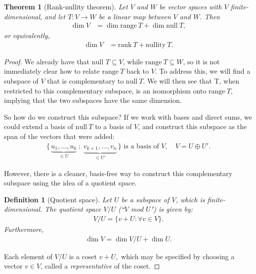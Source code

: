 \documentclass{article}
\numberwithin{equation}{section}
\newtheorem{theorem}[equation]{Theorem}
\newtheorem{definition}[equation]{Definition}
\begin{document}
\begin{theorem}[Rank-nullity theorem]
    Let $V$ and $W$ be vector spaces with $V$ finite-dimensional, and let $T: V \to W$ be a linear map between $V$ and $W$. Then
\begin{align*}
\dim V &= \dim\mathrm{range}\ T + \dim\mathrm{null}\ T,
\end{align*}
or equivalently,
\begin{align*}
\dim V &= \mathrm{rank}\ T + \mathrm{nullity}\ T.
\end{align*}
\end{theorem}

\begin{proof}
We already have that $\text{null }T \subseteq V$, while $\mathrm{range}\ T \subseteq W$, so it is not immediately clear how to relate $\mathrm{range}\ T$ back to $V$. To address this, we will find a subspace of $V$ that is complementary to $\mathrm{null}\ T$. We will then see that T, when restricted to this complementary subspace, is an isomorphism onto $\mathrm{range}\ T$, implying that the two subspaces have the same dimension.

So how do we construct this subspace? If we work with bases and direct sums, we could extend a basis of $\mathrm{null}\ T$ to a basis of $V$, and construct this subspace as the span of the vectors that were added:
\begin{align}
\label{eq:U'}
\{\, 
\underbrace{u_1,\dots,u_k}_{\in U}
\;;\;
\underbrace{v_{k+1},\dots,v_n}_{\in U'}
\,\}
\text{ is a basis of } V,
\quad V = U \oplus U'.
\end{align}

However, there is a cleaner, basis-free way to construct this complementary subspace using the idea of a quotient space.

\begin{definition}[Quotient space]
Let $U$ be a subspace of $V$, which is finite-dimensional. The quotient space $V/U$ (``$V$ mod $U$") is given by:
\begin{align*}
V/U = \{v + U : \forall v\in V \}.
\end{align*}
Furthermore,
\begin{align}
\label{eq:quotient-dim}
\dim V = \dim V/U + \dim U.
\end{align}
\end{definition}

Each element of $V/U$ is a coset $v + U,$ which may be specified by choosing a vector $v \in V$, called a \textit{representative} of the coset.


\end{proof}
\end{document}

